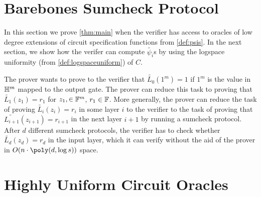 \section{Barebones Sumcheck Protocol}

In this section we prove \cref{thm:main} when the verifier has access to
oracles of low degree extensions of circuit specification functions from
\cref{def:psis}. In the next section, we show how the verifer can compute
$\tilde{\psi_i}$s by using the logspace uniformity (from
\cref{def:logspaceuniform}) of $C$.

The prover wants to prove to the verifier that $\tilde{L_0}(1^m) = 1$ if $1^m$
is the value in $\mathbb{H}^m$ mapped to the output gate. The prover can reduce this
task to proving that $\tilde{L_1}(z_1) = r_1$ for $z_1, \in \mathbb{F}^m$, $r_1 \in
\mathbb{F}$. More generally, the prover can reduce the task of proving
$\tilde{L_i}(z_i) = r_i$ in some layer $i$ to the verifier to the task of
proving that $\tilde{L_{i+1}}(z_{i+1}) = r_{i+1}$ in the next layer $i+1$ by
running a sumcheck protocol. After $d$ different sumcheck protocols, the
verifier has to check whether $\tilde{L_d}(z_d) = r_d$ in the input layer,
which it can verify without the aid of the prover in $O(n\cdot \poly(d, \log
s))$ space.

\section{Highly Uniform Circuit Oracles}